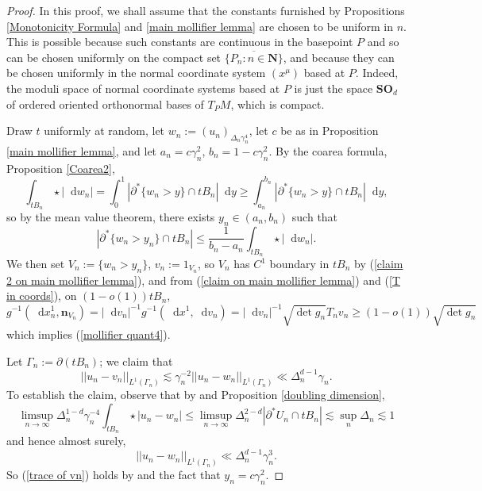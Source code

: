 \documentclass[reqno,12pt,letterpaper]{amsart}
\newcommand{\NN}{\mathbf{N}}
\newcommand{\SpOrth}{\mathbf{SO}}
\newcommand*\dif{\mathop{}\!\mathrm{d}}
\newcommand{\normal}{\mathbf n}
\theoremstyle{definition}
\numberwithin{equation}{section}
\begin{document}
\begin{proof}
In this proof, we shall assume that the constants furnished by Propositions \ref{Monotonicity Formula} and \ref{main mollifier lemma} are chosen to be uniform in $n$.
This is possible because such constants are continuous in the basepoint $P$ and so can be chosen uniformly on the compact set $\overline{\{P_n: n \in \NN\}}$, and because they can be chosen uniformly in the normal coordinate system $(x^\mu)$ based at $P$.
Indeed, the moduli space of normal coordinate systems based at $P$ is just the space $\SpOrth_d$ of ordered oriented orthonormal bases of $T_PM$, which is compact.

Draw $t$ uniformly at random, let $w_n := (u_n)_{\Delta_n \gamma_n^4}$, let $c$ be as in Proposition \ref{main mollifier lemma}, and let $a_n = c\gamma_n^2$, $b_n = 1 - c\gamma_n^2$.
By the coarea formula, Proposition \ref{Coarea2},
$$\int_{tB_n} \star |\dif w_n| = \int_0^1 |\partial^* \{w_n > y\} \cap tB_n| \dif y \geq \int_{a_n}^{b_n} |\partial^* \{w_n > y\} \cap tB_n| \dif y,$$
so by the mean value theorem, there exists $y_n \in (a_n, b_n)$ such that
\begin{equation}\label{MVT mollifier}
|\partial^* \{w_n > y_n\} \cap tB_n| \leq \frac{1}{b_n - a_n} \int_{tB_n} \star |\dif w_n|.
\end{equation}
We then set $V_n := \{w_n > y_n\}$, $v_n := 1_{V_n}$, so $V_n$ has $C^1$ boundary in $tB_n$ by (\ref{claim 2 on main mollifier lemma}), and from (\ref{claim on main mollifier lemma}) and (\ref{T in coords}), on $(1 - o(1))tB_n$,
\begin{equation}\label{mollifier prop4}
g^{-1}(\dif x^1_n, \normal_{V_n}) = |\dif v_n|^{-1} g^{-1}(\dif x^1, \dif v_n) = |\dif v_n|^{-1} \sqrt{\det g_n} T_n v_n \geq (1 - o(1)) \sqrt{\det g_n}
\end{equation}
which implies (\ref{mollifier quant4}).

Let $\Gamma_n := \partial(tB_n)$; we claim that 
\begin{equation}\label{trace of vn}
||u_n - v_n||_{L^1(\Gamma_n)} \lesssim \gamma_n^{-2} ||u_n - w_n||_{L^1(\Gamma_n)} \ll \Delta_n^{d - 1} \gamma_n.
\end{equation}
To establish the claim, observe that by \cite[Lemma 7.2]{Giusti77} and Proposition \ref{doubling dimension},
$$\limsup_{n \to \infty} \Delta_n^{1 - d} \gamma_n^{-4} \int_{tB_n} \star |u_n - w_n| \leq \limsup_{n \to \infty} \Delta_n^{2-d} |\partial^* U_n \cap tB_n| \lesssim \sup_n \Delta_n \lesssim 1$$
and hence almost surely,
$$||u_n - w_n||_{L^1(\Gamma_n)} \ll \Delta_n^{d - 1} \gamma_n^3.$$
So (\ref{trace of vn}) holds by \cite[Lemma 1.25]{Giusti77} and the fact that $y_n = c\gamma_n^2$.


\end{proof}
\end{document}

